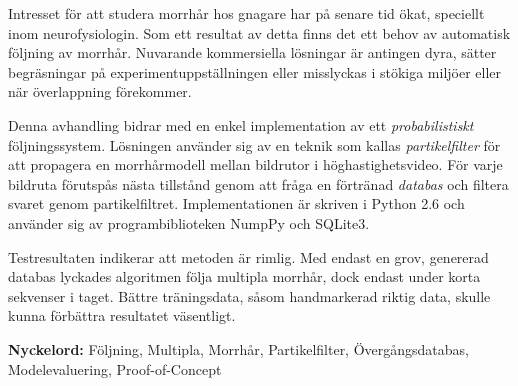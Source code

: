 
Intresset för att studera morrhår hos gnagare har på senare tid
ökat, speciellt inom neurofysiologin.  Som ett resultat av detta
finns det ett behov av automatisk följning av morrhår.  Nuvarande
kommersiella lösningar är antingen dyra, sätter
begräsningar på experimentuppställningen eller misslyckas i
stökiga miljöer eller när överlappning förekommer.

Denna avhandling bidrar med en enkel implementation av ett
\emph{probabilistiskt} följningssystem.  Lösningen använder sig av
en teknik som kallas \emph{partikelfilter} för att propagera en
morrhårmodell mellan bildrutor i höghastighetsvideo.  För varje
bildruta förutspås nästa tillstånd genom att fråga en förtränad
\emph{databas} och filtera svaret genom partikelfiltret.
Implementationen är skriven i Python 2.6 och använder sig av
programbiblioteken NumpPy och SQLite3.

Testresultaten indikerar att metoden är rimlig.  Med endast en grov,
genererad databas lyckades algoritmen följa multipla morrhår, dock
endast under korta sekvenser i taget.  Bättre träningsdata, såsom
handmarkerad riktig data, skulle kunna förbättra resultatet
väsentligt.


\textbf{Nyckelord:} Följning, Multipla, Morrhår, Partikelfilter,
Övergångsdatabas, Modelevaluering, Proof-of-Concept
